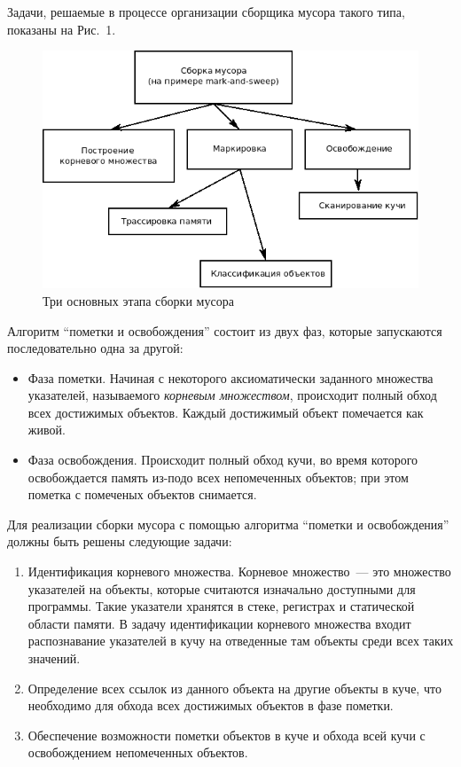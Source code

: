 Задачи, решаемые в процессе организации сборщика мусора такого типа, показаны на Рис.~1.

\begin{figure}[h!]
	\centering
	\includegraphics[width=\linewidth]{Kren/picture1.png}
	\caption{Три основных этапа сборки мусора}
	\centering
\end{figure}

Алгоритм ``пометки и освобождения'' состоит из двух фаз, которые запускаются последовательно
одна за другой:

\begin{itemize}
\item Фаза пометки. Начиная с некоторого аксиоматически заданного множества указателей, называемого
\emph{корневым множеством}, происходит полный обход всех достижимых объектов. Каждый достижимый
объект помечается как живой.
\item Фаза освобождения. Происходит полный обход кучи, во время которого освобождается память
из-подо всех непомеченных объектов; при этом пометка с помеченых объектов снимается.
\end{itemize}

Для реализации сборки мусора с помощью алгоритма ``пометки и освобождения'' должны быть решены
следующие задачи:

\begin{enumerate}
\item Идентификация корневого множества. Корневое множество~--- это множество указателей на
объекты, которые считаются изначально доступными для программы. Такие указатели хранятся в
стеке, регистрах и статической области памяти. В задачу идентификации корневого множества 
входит распознавание указателей в кучу на отведенные там объекты среди всех таких значений.

\item Определение всех ссылок из данного объекта на другие объекты в куче, что необходимо для
обхода всех достижимых объектов в фазе пометки.

\item Обеспечение возможности пометки объектов в куче и обхода всей кучи с освобождением 
непомеченных объектов.
\end{enumerate}

